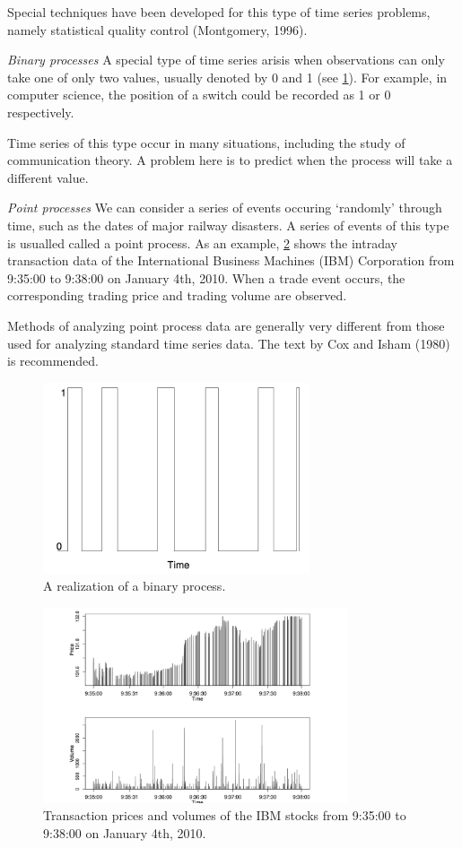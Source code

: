 Special techniques have been developed for this type of time series problems, namely statistical quality control (Montgomery, 1996).

\textit{Binary processes}
A special type of time series arisis when observations can only take one of only two values, usually denoted by 0 and 1 (see \cref{fig:1.7}). For example, in computer science, the position of a switch could be recorded as 1 or 0 respectively.


Time series of this type occur in many situations, including the study of communication theory. A problem here is to predict when the process will take a different value.

\textit{Point processes}
We can consider a series of events occuring `randomly' through time, such as the dates of major railway disasters. A series of events of this type is usualled called a point process. As an example, \cref{fig:1.8} shows the intraday transaction data of the International Business Machines (IBM) Corporation from 9:35:00 to 9:38:00 on January 4th, 2010. When a trade event occurs, the corresponding trading price and trading volume are observed.

Methods of analyzing point process data are generally very different from those used for analyzing standard time series data. The text by Cox and Isham (1980) is recommended.

\newpage
\begin{figure}[ht]
	\centering
	\includegraphics[width=0.7\textwidth]{Chapter 1/fig1-7.png}
	\caption{A realization of a binary process.}
	\label{fig:1.7}
\end{figure}

\begin{figure}[h]
	\centering
	\includegraphics[width=0.8\textwidth]{Chapter 1/fig1-8.png}
	\caption{Transaction prices and volumes of the IBM stocks from 9:35:00 to 9:38:00 on January 4th, 2010.}
	\label{fig:1.8}
\end{figure}

